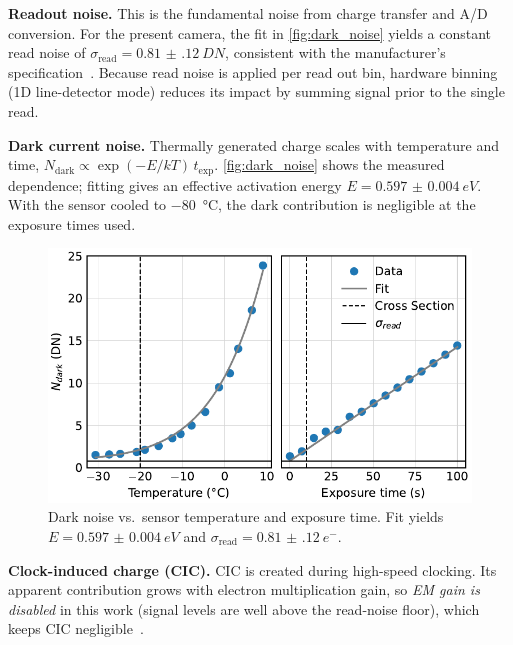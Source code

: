 \documentclass[
	a4paper,
]{scrarticle}
\begin{document}
\textbf{Readout noise.}
This is the fundamental noise from charge transfer and A/D conversion. For the present camera, the fit in \autoref{fig:dark_noise} yields a constant read noise of
\(\sigma_{\text{read}}=\SI{0.81(12)}{DN}\), consistent with the manufacturer’s specification~\cite{andorIXonEM897Manual}.
Because read noise is applied per read out bin, hardware binning (1D line-detector mode) reduces its impact by summing signal prior to the single read.

\textbf{Dark current noise.}
Thermally generated charge scales with temperature and time,
\(N_\text{dark}\propto \exp(-E/kT)\,t_\text{exp}\).
\autoref{fig:dark_noise} shows the measured dependence; fitting gives an effective activation energy \(E=\SI{0.597(4)}{eV}\).
With the sensor cooled to \SI{-80}{\degreeCelsius}, the dark contribution is negligible at the exposure times used.

\begin{figure}[h]
    \centering
    \includegraphics{../analysis/figures/dark_noise.pdf}
    \caption{Dark noise vs.\ sensor temperature and exposure time. Fit yields \(E=\SI{0.597(4)}{eV}\) and \(\sigma_{\text{read}}=\SI{0.81(12)}{e^{-}}\).}
    \label{fig:dark_noise}
\end{figure}

\textbf{Clock-induced charge (CIC).}
CIC is created during high-speed clocking.
Its apparent contribution grows with electron multiplication gain, so \emph{EM gain is disabled} in this work (signal levels are well above the read-noise floor), which keeps CIC negligible~\cite{andorEstablishingSensitivityScientifica}.
\end{document}
